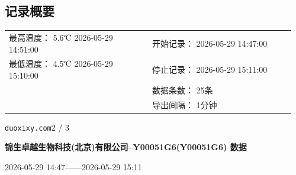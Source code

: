 \documentclass[UTF8,10pt,a4paper,fontset=fandol]{ctexart}
\newcommand{\fieldvalue}[1]{#1}
\begin{document}
\subsection*{记录概要}

\begin{tabular}{@{}p{0.48\linewidth}p{0.48\linewidth}@{}}
最高温度：
\fieldvalue{5.6℃}
\quad
\fieldvalue{2026-05-29 14:51:00}
&
开始记录：
\fieldvalue{2026-05-29 14:47:00}
\\
最低温度：
\fieldvalue{4.5℃}
\quad
\fieldvalue{2026-05-29 15:10:00}
&
停止记录：
\fieldvalue{2026-05-29 15:11:00}
\\
&
数据条数：
\fieldvalue{25条}
\\
&
导出间隔：
\fieldvalue{1分钟}
\end{tabular}

\vspace{2cm}

\begin{figure}[ht]
\centering
\end{figure}

\vfill

\noindent\texttt{duoxixy.com}\hfill 2 / 3

\newpage

\begin{center}
\textbf{锦生卓越生物科技(北京)有限公司--Y00051G6(Y00051G6) 数据}

2026-05-29 14:47——2026-05-29 15:11
\end{center}
\end{document}
